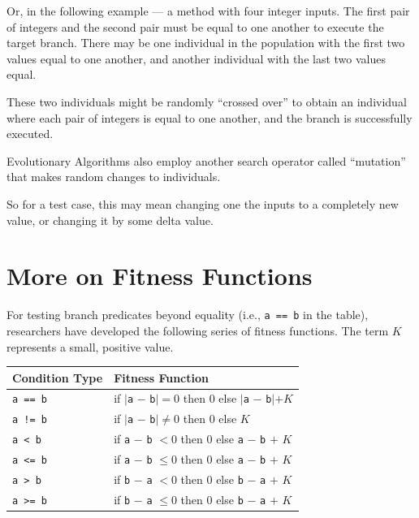 
Or, in the following example --- a method with four integer inputs. The first
pair of integers and the second pair must be equal to one another to execute the
target branch. There may be one individual in the population with the first two
values equal to one another, and another individual with the last two values
equal. 


These two individuals might be randomly ``crossed over'' to obtain an individual
where each pair of integers is equal to one another, and the branch is
successfully executed.



Evolutionary Algorithms also employ another search operator called ``mutation''
that makes random changes to individuals. 


So for a test case, this may mean changing one the inputs to a completely new
value, or changing it by some delta value. 





\section{More on Fitness Functions}

For testing branch predicates beyond equality (i.e., {\tt a == b} in the table),
researchers have developed the following series of fitness functions. The term
$K$ represents a small, positive value.

\begin{center}
    \begin{tabular}{ll}
        \toprule
        {\bf Condition Type} & {\bf Fitness Function} \\
        \midrule
        {\tt a == b} & if $|${\tt a} $-$ {\tt b}$| = 0$ then $0$ else $|${\tt a}
        $-$ {\tt b}$| + K$ \\
        {\tt a != b} & if $|${\tt a} $-$ {\tt b}$| \neq 0$ then $0$ else $K$ \\
        {\tt a < b}  & if {\tt a} $-$ {\tt b} $< 0$ then $0$ else {\tt a} $-$
        {\tt b} $+$ $K$ \\
        {\tt a <= b} & if {\tt a} $-$ {\tt b} $\leq 0$ then $0$ else {\tt a} $-$
        {\tt b} $+$ $K$ \\
        {\tt a > b}  & if {\tt b} $-$ {\tt a} $< 0$ then $0$ else {\tt b} $-$
        {\tt a} $+$ $K$ \\
        {\tt a >= b} & if {\tt b} $-$ {\tt a} $\leq 0$ then $0$ else {\tt b} $-$
        {\tt a} $+$ $K$ \\
        \bottomrule
    \end{tabular}
\end{center}    
    
